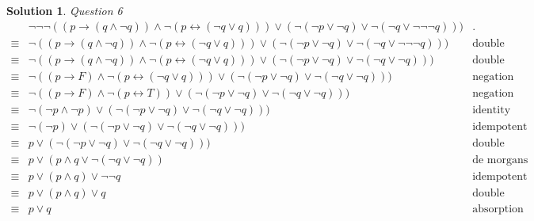 \documentclass{article}
\theoremstyle{definition}
\newtheorem*{solution}{Solution}
\begin{document}
\begin{solution}
 \textit{Question 6}
 \begin{align*}
 & \neg\neg\neg((p \to ( q \wedge \neg q)) \wedge \neg ( p \leftrightarrow (\neg q \vee q))) \vee ( \neg ( \neg p \vee \neg q) \vee \neg ( \neg q \vee \neg \neg \neg q))) & \text{.}\ \\
 \equiv & \neg((p \to ( q \wedge \neg q)) \wedge \neg ( p \leftrightarrow (\neg q \vee q))) \vee ( \neg ( \neg p \vee \neg q) \vee \neg ( \neg q \vee \neg \neg \neg q))) & \text{double negation}\ \\
 \equiv & \neg((p \to ( q \wedge \neg q)) \wedge \neg ( p \leftrightarrow (\neg q \vee q))) \vee ( \neg ( \neg p \vee \neg q) \vee \neg ( \neg q \vee \neg q))) & \text{double negation}\ \\
 \equiv & \neg((p \to F) \wedge \neg ( p \leftrightarrow (\neg q \vee q))) \vee ( \neg ( \neg p \vee \neg q) \vee \neg ( \neg q \vee \neg q))) & \text{negation}\ \\
 \equiv & \neg((p \to F) \wedge \neg ( p \leftrightarrow T)) \vee ( \neg ( \neg p \vee \neg q) \vee \neg ( \neg q \vee \neg q))) & \text{negation}\ \\
 \equiv & \neg(\neg p \wedge \neg  p ) \vee ( \neg ( \neg p \vee \neg q) \vee \neg ( \neg q \vee \neg q))) & \text{identity}\ \\
 \equiv & \neg(\neg  p ) \vee ( \neg ( \neg p \vee \neg q) \vee \neg ( \neg q \vee \neg q))) & \text{idempotent}\ \\
 \equiv & p \vee ( \neg ( \neg p \vee \neg q) \vee \neg ( \neg q \vee \neg q))) & \text{double negation}\ \\
 \equiv & p \vee ( p \wedge q \vee \neg ( \neg q \vee \neg q)) & \text{de morgans}\ \\
 \equiv & p \vee ( p \wedge q) \vee \neg \neg q & \text{idempotent}\ \\
 \equiv & p \vee ( p \wedge q) \vee q & \text{double negation}\ \\
 \equiv & p \vee q & \text{absorption}\ \\
 \end{align*}
 

\end{solution}
\end{document}
